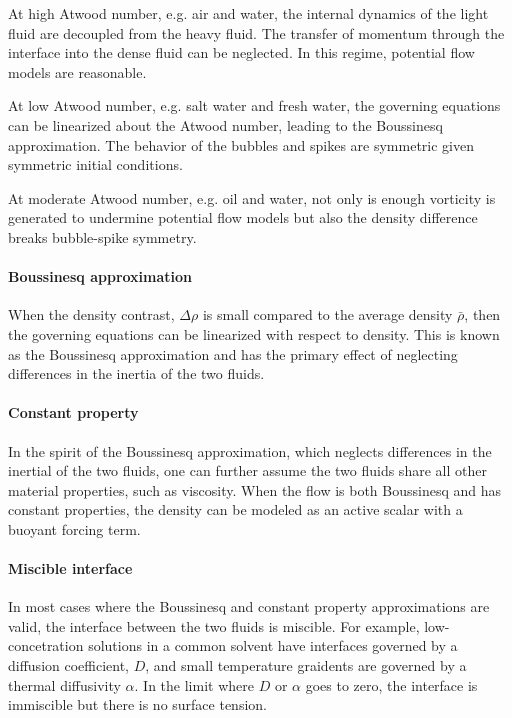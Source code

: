 At high Atwood number, e.g. air and water, the internal dynamics of the light fluid are decoupled from the heavy fluid.
The transfer of momentum through the interface into the dense fluid can be neglected.
In this regime, potential flow models are reasonable.

At low Atwood number, e.g. salt water and fresh water, the governing equations can be linearized about the Atwood number, leading to the Boussinesq approximation.
The behavior of the bubbles and spikes are symmetric given symmetric initial conditions.

At moderate Atwood number, e.g. oil and water, not only is enough vorticity is generated to undermine potential flow models but also the density difference breaks bubble-spike symmetry.

\paragraph{Boussinesq approximation}
When the density contrast, $\Delta \rho$ is small compared to the average density $\bar{\rho}$, then 
the governing equations can be linearized with respect to density.
This is known as the Boussinesq approximation and has the primary effect of neglecting differences in the inertia of the two fluids.

\paragraph{Constant property}
In the spirit of the Boussinesq approximation, which neglects differences in the inertial of the two fluids, one can further assume the two fluids share all other material properties, such as viscosity.
When the flow is both Boussinesq and has constant properties, the density can be modeled as an active scalar with a buoyant forcing term.

\paragraph{Miscible interface}
In most cases where the Boussinesq and constant property approximations are valid, the interface between the two fluids is miscible.
For example, low-concetration solutions in a common solvent have interfaces governed by a diffusion coefficient, $D$, and small temperature graidents are governed by a thermal diffusivity $\alpha$.
In the limit where $D$ or $\alpha$ goes to zero, the interface is immiscible but there is no surface tension.

